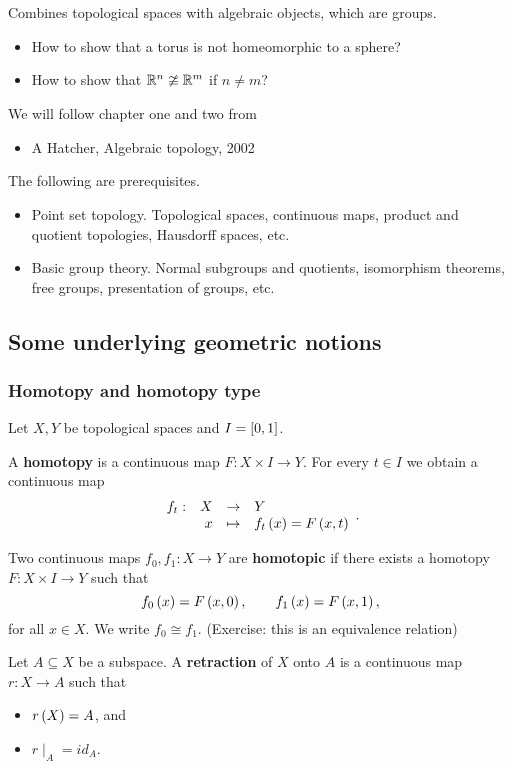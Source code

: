 Combines topological spaces with algebraic objects, which are groups.
\begin{itemize}
\item How to show that a torus is not homeomorphic to a sphere?
\item How to show that $ \R^n \ncong \R^m $ if $ n \ne m $?
\end{itemize}
We will follow chapter one and two from
\begin{itemize}
\item A Hatcher, Algebraic topology, 2002
\end{itemize}
The following are prerequisites.
\begin{itemize}
\item Point set topology. Topological spaces, continuous maps, product and quotient topologies, Hausdorff spaces, etc.
\item Basic group theory. Normal subgroups and quotients, isomorphism theorems, free groups, presentation of groups, etc.
\end{itemize}

\pagebreak

\subsection{Some underlying geometric notions}

\subsubsection{Homotopy and homotopy type}

Let $ X, Y $ be topological spaces and $ I = \sb{0, 1} $.

\begin{definition*}
A \textbf{homotopy} is a continuous map $ F : X \times I \to Y $. For every $ t \in I $ we obtain a continuous map
$$ \function[f_t]{X}{Y}{x}{f_t\rb{x} = F\rb{x, t}}. $$
\end{definition*}

\begin{definition*}
Two continuous maps $ f_0, f_1 : X \to Y $ are \textbf{homotopic} if there exists a homotopy $ F : X \times I \to Y $ such that
$$ f_0\rb{x} = F\rb{x, 0}, \qquad f_1\rb{x} = F\rb{x, 1}, $$
for all $ x \in X $. We write $ f_0 \cong f_1 $. (Exercise: this is an equivalence relation)
\end{definition*}

\begin{definition*}
Let $ A \subseteq X $ be a subspace. A \textbf{retraction} of $ X $ onto $ A $ is a continuous map $ r : X \to A $ such that
\begin{itemize}
\item $ r\rb{X} = A $, and
\item $ r\mid_A = id_A $.
\end{itemize}
\end{definition*}

